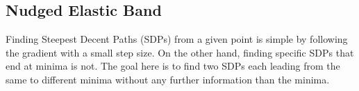 \subsection{Nudged Elastic Band}
\label{sec:neb}

Finding Steepest Decent Paths (SDPs) from a given point is simple by following the gradient with a small step size.
On the other hand, finding specific SDPs that end at minima is not.
The goal here is to find two SDPs each leading from the same  to different minima without any further information than the minima.

\incomplete
